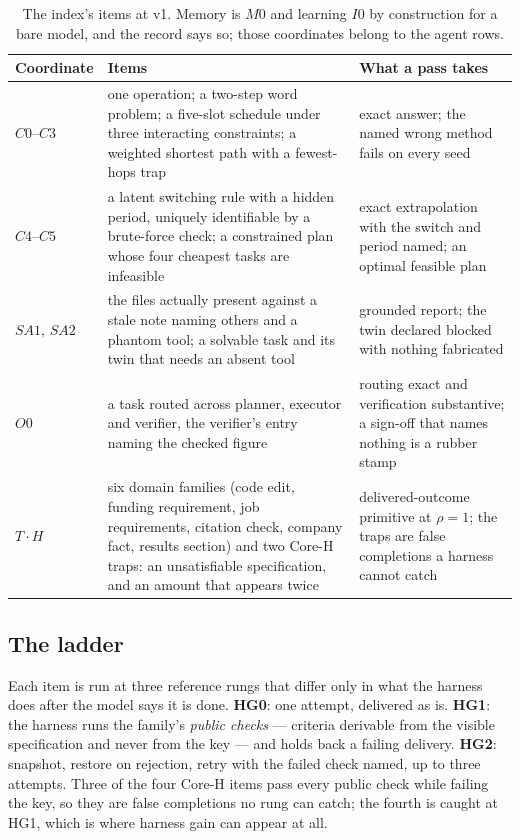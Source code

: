 \documentclass[11pt]{article}
\theoremstyle{definition}
\begin{document}
\begin{table}[H]
\centering\small
\begin{tabularx}{\textwidth}{@{}llY@{}}
\toprule
Coordinate & Items & What a pass takes \\
\midrule
$C0$--$C3$ & one operation; a two-step word problem; a five-slot schedule under three interacting constraints; a weighted shortest path with a fewest-hops trap & exact answer; the named wrong method fails on every seed \\
$C4$--$C5$ & a latent switching rule with a hidden period, uniquely identifiable by a brute-force check; a constrained plan whose four cheapest tasks are infeasible & exact extrapolation with the switch and period named; an optimal feasible plan \\
$SA1$, $SA2$ & the files actually present against a stale note naming others and a phantom tool; a solvable task and its twin that needs an absent tool & grounded report; the twin declared blocked with nothing fabricated \\
$O0$ & a task routed across planner, executor and verifier, the verifier's entry naming the checked figure & routing exact and verification substantive; a sign-off that names nothing is a rubber stamp \\
$T\cdot H$ & six domain families (code edit, funding requirement, job requirements, citation check, company fact, results section) and two Core-H traps: an unsatisfiable specification, and an amount that appears twice & delivered-outcome primitive at $\rho = 1$; the traps are false completions a harness cannot catch \\
\bottomrule
\end{tabularx}
\caption{The index's items at v1. Memory is $M0$ and learning $I0$ by construction for a bare model, and the record says so; those coordinates belong to the agent rows.}
\label{tab:items}
\end{table}

\subsection{The ladder}

Each item is run at three reference rungs that differ only in what the harness does after the model says it is done. \textbf{HG0}: one attempt, delivered as is. \textbf{HG1}: the harness runs the family's \emph{public checks} --- criteria derivable from the visible specification and never from the key --- and holds back a failing delivery. \textbf{HG2}: snapshot, restore on rejection, retry with the failed check named, up to three attempts. Three of the four Core-H items pass every public check while failing the key, so they are false completions no rung can catch; the fourth is caught at HG1, which is where harness gain can appear at all.
\end{document}

